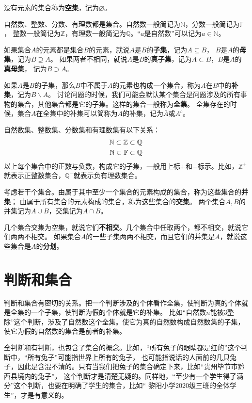 \documentclass[12pt,UTF8]{ctexbook}
\begin{document}
没有元素的集合称为\textbf{空集}，记为$\varnothing$。

自然数、整数、分数、有理数都是集合。自然数一般简记为$\mathbb{N}$，分数一般简记为$\mathbb{F}$，
整数一般简记为$\mathbb{Z}$，有理数一般简记为$\mathbb{Q}$。“$a$是自然数”可以记为$a\in\mathbb{N}$。

如果集合$A$的元素都是集合$B$的元素，就说$A$是$B$的\textbf{子集}，记为$A\subseteq B$，
$B$是$A$的\textbf{母集}，记为$B\supseteq A$。
如果两者不相同，就说$A$是$B$的\textbf{真子集}，记为$A\subset B$，$B$是$A$的\textbf{真母集}，
记为$B\supset A$。

如果$A$是$B$的子集，那么$B$中不属于$A$的元素也构成一个集合，称为$A$在$B$中的\textbf{补集}，记为$B\backslash A$。
讨论问题的时候，我们可能会默认某个集合是问题涉及的所有事物的集合，其他集合都是它的子集。这样的集合一般称为\textbf{全集}。
全集存在的时候，集合$A$在全集中的补集可以简称为$A$的补集，记为$\bar{A}$或$A^c$。

自然数集、整数集、分数集和有理数集有以下关系：
\begin{align}
    \mathbb{N}\subset\mathbb{Z}\subset\mathbb{Q} \notag \\
    \mathbb{N}\subset\mathbb{F}\subset\mathbb{Q} \notag
\end{align}
以上每个集合中的正数与负数，构成它的子集，一般用上标$+$和$-$标示。比如，$\mathbb{Z}^+$就表示正整数集合，$\mathbb{Q}^-$就表示负有理数集合。

考虑若干个集合。由属于其中至少一个集合的元素构成的集合，称为这些集合的\textbf{并集}；
由属于所有集合的元素构成的集合，称为这些集合的\textbf{交集}。
两个集合$A, B$的并集记为$A\cup B$，交集记为$A\cap B$。

几个集合交集为空集，就说它们\textbf{不相交}。几个集合中任取两个，都不相交，就说它们两两不相交。
如果集合$A$的一些子集两两不相交，而且它们的并集是$A$，就说这些集合是$A$的\textbf{分划}。

\section{判断和集合}
判断和集合有密切的关系。把一个判断涉及的个体看作全集，使判断为真的个体就是全集的一个子集，使判断为假的个体就是它的补集。
比如“自然数$n$能被$3$整除”这个判断，涉及了自然数这个全集。使它为真的自然数构成自然数集的子集，使它为假的自然数的集合是前者的补集。

全判断和有判断，也包含了集合的概念。比如，“所有兔子的眼睛都是红的”这个判断中，“所有兔子”可能指世界上所有的兔子，
也可能指说话的人面前的几只兔子，因此是含混不清的。只有当我们把兔子的集合确定下来，比如“贵州毕节市黔西县境内的兔子”，
这个判断才是清楚无疑的。同样地，“至少有一个学生得了满分”这个判断，也要在明确了学生的集合，比如“
黎阳小学$2020$级三班的全体学生”，才是有意义的。
\end{document}
